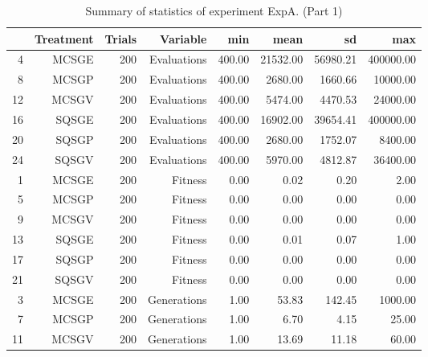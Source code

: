 \begin{table}[ht]
\centering
\begin{tabular}{rrrrrrrr}
  \hline
 & Treatment & Trials & Variable & min & mean & sd & max \\ 
  \hline
4 & MCSGE & 200 & Evaluations & 400.00 & 21532.00 & 56980.21 & 400000.00 \\ 
  8 & MCSGP & 200 & Evaluations & 400.00 & 2680.00 & 1660.66 & 10000.00 \\ 
  12 & MCSGV & 200 & Evaluations & 400.00 & 5474.00 & 4470.53 & 24000.00 \\ 
  16 & SQSGE & 200 & Evaluations & 400.00 & 16902.00 & 39654.41 & 400000.00 \\ 
  20 & SQSGP & 200 & Evaluations & 400.00 & 2680.00 & 1752.07 & 8400.00 \\ 
  24 & SQSGV & 200 & Evaluations & 400.00 & 5970.00 & 4812.87 & 36400.00 \\ 
  1 & MCSGE & 200 & Fitness & 0.00 & 0.02 & 0.20 & 2.00 \\ 
  5 & MCSGP & 200 & Fitness & 0.00 & 0.00 & 0.00 & 0.00 \\ 
  9 & MCSGV & 200 & Fitness & 0.00 & 0.00 & 0.00 & 0.00 \\ 
  13 & SQSGE & 200 & Fitness & 0.00 & 0.01 & 0.07 & 1.00 \\ 
  17 & SQSGP & 200 & Fitness & 0.00 & 0.00 & 0.00 & 0.00 \\ 
  21 & SQSGV & 200 & Fitness & 0.00 & 0.00 & 0.00 & 0.00 \\ 
  3 & MCSGE & 200 & Generations & 1.00 & 53.83 & 142.45 & 1000.00 \\ 
  7 & MCSGP & 200 & Generations & 1.00 & 6.70 & 4.15 & 25.00 \\ 
  11 & MCSGV & 200 & Generations & 1.00 & 13.69 & 11.18 & 60.00 \\ 
   \hline
\end{tabular}
\caption{Summary of statistics of experiment ExpA. (Part 1)} 
\end{table}
